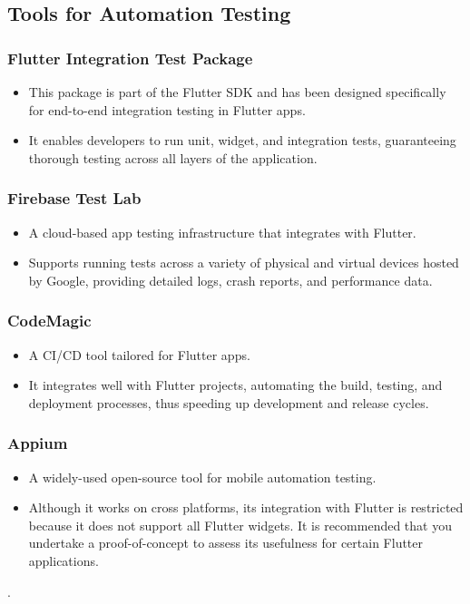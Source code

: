 \subsection{Tools for Automation Testing}
\subsubsection{Flutter Integration Test Package}
\begin{itemize}
    \item This package is part of the Flutter SDK and has been designed specifically for end-to-end integration testing in Flutter apps.
    \item It enables developers to run unit, widget, and integration tests, guaranteeing thorough testing across all layers of the application.
\end{itemize}
\subsubsection{Firebase Test Lab}
\begin{itemize}
    \item A cloud-based app testing infrastructure that integrates with Flutter.
    \item Supports running tests across a variety of physical and virtual devices hosted by Google, providing detailed logs, crash reports, and performance data.
\end{itemize}
\subsubsection{CodeMagic}
\begin{itemize}
    \item A CI/CD tool tailored for Flutter apps.
    \item It integrates well with Flutter projects, automating the build, testing, and deployment processes, thus speeding up development and release cycles.
\end{itemize}
\subsubsection{Appium}
\begin{itemize}
    \item A widely-used open-source tool for mobile automation testing.
    \item Although it works on cross platforms, its integration with Flutter is restricted because it does not support all Flutter widgets. It is recommended that you undertake a proof-of-concept to assess its usefulness for certain Flutter applications.
\end{itemize}
.
